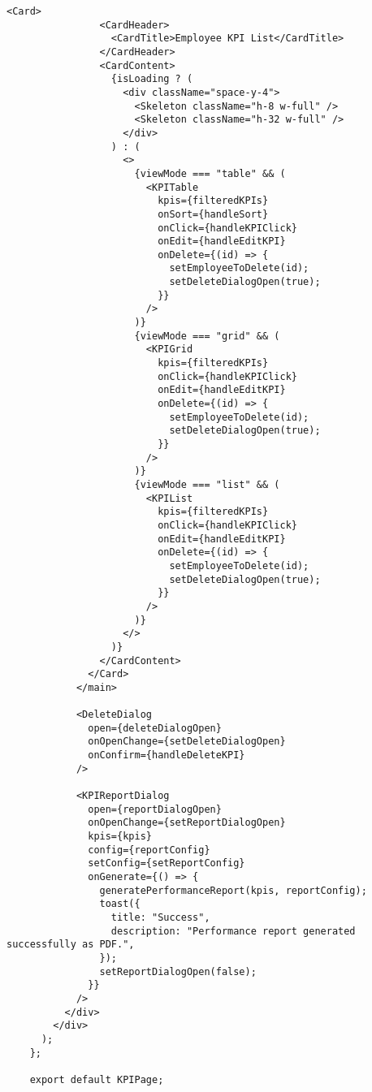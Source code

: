 \begin{lstlisting}[language=Golang, caption=Routes, frame=single]
              <Card>
                <CardHeader>
                  <CardTitle>Employee KPI List</CardTitle>
                </CardHeader>
                <CardContent>
                  {isLoading ? (
                    <div className="space-y-4">
                      <Skeleton className="h-8 w-full" />
                      <Skeleton className="h-32 w-full" />
                    </div>
                  ) : (
                    <>
                      {viewMode === "table" && (
                        <KPITable
                          kpis={filteredKPIs}
                          onSort={handleSort}
                          onClick={handleKPIClick}
                          onEdit={handleEditKPI}
                          onDelete={(id) => {
                            setEmployeeToDelete(id);
                            setDeleteDialogOpen(true);
                          }}
                        />
                      )}
                      {viewMode === "grid" && (
                        <KPIGrid
                          kpis={filteredKPIs}
                          onClick={handleKPIClick}
                          onEdit={handleEditKPI}
                          onDelete={(id) => {
                            setEmployeeToDelete(id);
                            setDeleteDialogOpen(true);
                          }}
                        />
                      )}
                      {viewMode === "list" && (
                        <KPIList
                          kpis={filteredKPIs}
                          onClick={handleKPIClick}
                          onEdit={handleEditKPI}
                          onDelete={(id) => {
                            setEmployeeToDelete(id);
                            setDeleteDialogOpen(true);
                          }}
                        />
                      )}
                    </>
                  )}
                </CardContent>
              </Card>
            </main>
    
            <DeleteDialog
              open={deleteDialogOpen}
              onOpenChange={setDeleteDialogOpen}
              onConfirm={handleDeleteKPI}
            />
    
            <KPIReportDialog
              open={reportDialogOpen}
              onOpenChange={setReportDialogOpen}
              kpis={kpis}
              config={reportConfig}
              setConfig={setReportConfig}
              onGenerate={() => {
                generatePerformanceReport(kpis, reportConfig);
                toast({
                  title: "Success",
                  description: "Performance report generated successfully as PDF.",
                });
                setReportDialogOpen(false);
              }}
            />
          </div>
        </div>
      );
    };
    
    export default KPIPage;
    

\end{lstlisting}